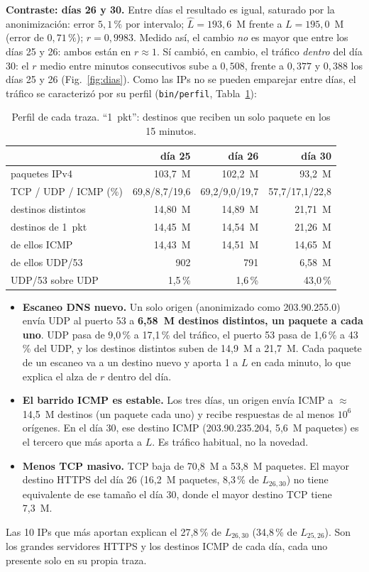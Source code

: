 \documentclass[conference]{IEEEtran}
\newcommand{\Lh}{\hat L}
\begin{document}
\textbf{Contraste: días 26 y 30.} Entre días el resultado es igual, saturado por la anonimización: error $5{,}1\,\%$ por intervalo; $\Lh=193{,}6$~M frente a $L=195{,}0$~M (error de $0{,}71\,\%$); $r=0{,}9983$. Medido así, el cambio \emph{no} es mayor que entre los días 25 y 26: ambos están en $r\approx1$. Sí cambió, en cambio, el tráfico \emph{dentro} del día 30: el $r$ medio entre minutos consecutivos sube a $0{,}508$, frente a $0{,}377$ y $0{,}388$ los días 25 y 26 (Fig.~\ref{fig:dias}). Como las IPs no se pueden emparejar entre días, el tráfico se caracterizó por su perfil (\texttt{bin/perfil}, Tabla~\ref{tab:perfil}):

\begin{table}[t]
\centering
\caption{Perfil de cada traza. ``1~pkt'': destinos que reciben un solo paquete en los 15 minutos.}
\label{tab:perfil}
\setlength{\tabcolsep}{3pt}
\begin{tabular}{lrrr}
\toprule
 & día 25 & día 26 & día 30 \\
\midrule
paquetes IPv4 & 103,7~M & 102,2~M & 93,2~M \\
TCP / UDP / ICMP (\%) & 69,8/8,7/19,6 & 69,2/9,0/19,7 & 57,7/17,1/22,8 \\
destinos distintos & 14,80~M & 14,89~M & 21,71~M \\
destinos de 1~pkt & 14,45~M & 14,54~M & 21,26~M \\
\quad de ellos ICMP & 14,43~M & 14,51~M & 14,65~M \\
\quad de ellos UDP/53 & 902 & 791 & 6,58~M \\
UDP/53 sobre UDP & 1,5\,\% & 1,6\,\% & 43,0\,\% \\
\bottomrule
\end{tabular}
\end{table}

\begin{itemize}
\item \textbf{Escaneo DNS nuevo.} Un solo origen (anonimizado como 203.90.255.0) envía UDP al puerto 53 a \textbf{6,58~M destinos distintos, un paquete a cada uno}. UDP pasa de 9,0\,\% a 17,1\,\% del tráfico, el puerto 53 pasa de 1,6\,\% a 43\,\% del UDP, y los destinos distintos suben de 14,9~M a 21,7~M. Cada paquete de un escaneo va a un destino nuevo y aporta 1 a $L$ en cada minuto, lo que explica el alza de $r$ dentro del día.
\item \textbf{El barrido ICMP es estable.} Los tres días, un origen envía ICMP a $\approx$14,5~M destinos (un paquete cada uno) y recibe respuestas de al menos $10^6$ orígenes. En el día 30, ese destino ICMP (203.90.235.204, 5,6~M paquetes) es el tercero que más aporta a $L$. Es tráfico habitual, no la novedad.
\item \textbf{Menos TCP masivo.} TCP baja de 70,8~M a 53,8~M paquetes. El mayor destino HTTPS del día 26 (16,2~M paquetes, 8,3\,\% de $L_{26,30}$) no tiene equivalente de ese tamaño el día 30, donde el mayor destino TCP tiene 7,3~M.
\end{itemize}
Las 10 IPs que más aportan explican el 27,8\,\% de $L_{26,30}$ (34,8\,\% de $L_{25,26}$). Son los grandes servidores HTTPS y los destinos ICMP de cada día, cada uno presente solo en su propia traza.
\end{document}
